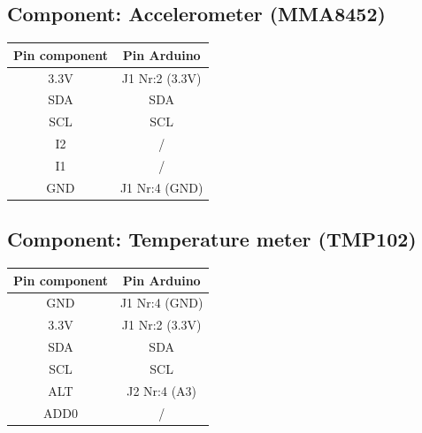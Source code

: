 \documentclass[a4paper]{report}
\begin{document}
        \subsection{Component: Accelerometer (MMA8452)}
            \begin{tabular}{|c|c|}
                \hline
                Pin component & Pin Arduino\\
                \hline
                3.3V & J1 Nr:2 (3.3V)\\
                SDA  & SDA\\
                SCL  & SCL\\
                I2   & /\\
                I1   & /\\
                GND  & J1 Nr:4 (GND)\\
                \hline
            \end{tabular}
            
        \subsection{Component: Temperature meter (TMP102)}
            \begin{tabular}{|c|c|}
                \hline
                Pin component & Pin Arduino\\
                \hline
                GND  & J1 Nr:4  (GND)\\
                3.3V & J1 Nr:2  (3.3V)\\
                SDA  & SDA\\
                SCL  & SCL\\
                ALT  & J2 Nr:4  (A3)\\
                ADD0 & /\\
                \hline
            \end{tabular}
            
\end{document}
